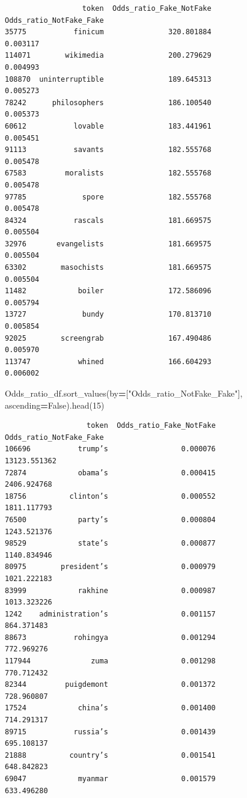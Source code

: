 \documentclass[
  11pt,
  a4paper,
]{article}
\newenvironment{Shaded}{\begin{snugshade}}{\end{snugshade}}
\newcommand{\DecValTok}[1]{\textcolor[rgb]{0.00,0.00,0.81}{#1}}
\newcommand{\NormalTok}[1]{#1}
\newcommand{\OperatorTok}[1]{\textcolor[rgb]{0.81,0.36,0.00}{\textbf{#1}}}
\newcommand{\StringTok}[1]{\textcolor[rgb]{0.31,0.60,0.02}{#1}}
\newcommand{\VariableTok}[1]{\textcolor[rgb]{0.00,0.00,0.00}{#1}}
\begin{document}
\begin{verbatim}
                  token  Odds_ratio_Fake_NotFake  Odds_ratio_NotFake_Fake
35775           finicum               320.801884                 0.003117
114071        wikimedia               200.279629                 0.004993
108870  uninterruptible               189.645313                 0.005273
78242      philosophers               186.100540                 0.005373
60612           lovable               183.441961                 0.005451
91113           savants               182.555768                 0.005478
67583         moralists               182.555768                 0.005478
97785             spore               182.555768                 0.005478
84324           rascals               181.669575                 0.005504
32976       evangelists               181.669575                 0.005504
63302        masochists               181.669575                 0.005504
11482            boiler               172.586096                 0.005794
13727             bundy               170.813710                 0.005854
92025        screengrab               167.490486                 0.005970
113747           whined               166.604293                 0.006002
\end{verbatim}

\begin{Shaded}
\begin{Highlighting}[]
\NormalTok{Odds\_ratio\_df.sort\_values(by}\OperatorTok{=}\NormalTok{[}\StringTok{"Odds\_ratio\_NotFake\_Fake"}\NormalTok{], ascending}\OperatorTok{=}\VariableTok{False}\NormalTok{).head(}\DecValTok{15}\NormalTok{)}
\end{Highlighting}
\end{Shaded}

\begin{verbatim}
                   token  Odds_ratio_Fake_NotFake  Odds_ratio_NotFake_Fake
106696           trump’s                 0.000076             13123.551362
72874            obama’s                 0.000415              2406.924768
18756          clinton’s                 0.000552              1811.117793
76500            party’s                 0.000804              1243.521376
98529            state’s                 0.000877              1140.834946
80975        president’s                 0.000979              1021.222183
83999            rakhine                 0.000987              1013.323226
1242    administration’s                 0.001157               864.371483
88673           rohingya                 0.001294               772.969276
117944              zuma                 0.001298               770.712432
82344         puigdemont                 0.001372               728.960807
17524            china’s                 0.001400               714.291317
89715           russia’s                 0.001439               695.108137
21888          country’s                 0.001541               648.842823
69047            myanmar                 0.001579               633.496280
\end{verbatim}
\end{document}
